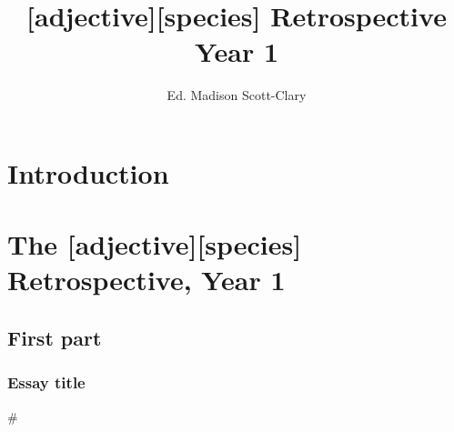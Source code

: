\documentclass[12pt,letterpaper,oneside]{memoir}
\newcommand\secdiv{
  \begin{center}
    \#
  \end{center}
}
\begin{document}
  \title{[adjective][species] Retrospective Year 1}
  \author{Ed. Madison Scott-Clary}
  \maketitle
  \newpage

  \tableofcontents

  \part{Introduction}
  

  \part{The [adjective][species] Retrospective, Year 1}
  \chapter{First part}
  \section{Essay title}
  

  \newpage
  \secdiv
\end{document}
